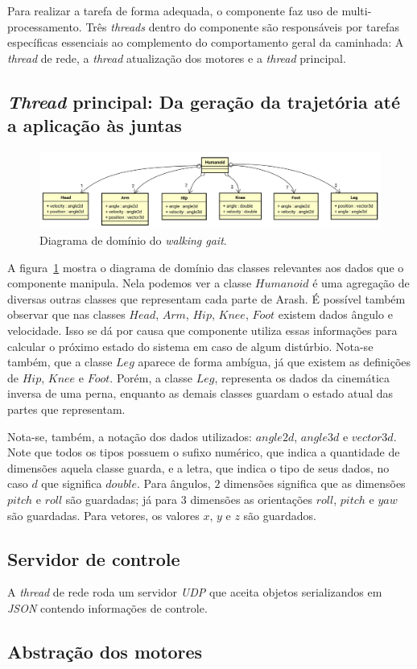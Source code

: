 Para realizar a tarefa de forma adequada, o componente faz uso de multi-processamento. Três \textit{threads} dentro do componente são responsáveis por tarefas específicas essenciais ao complemento do comportamento geral da caminhada: A \textit{thread} de rede, a \textit{thread} atualização dos motores e a \textit{thread} principal.

\subsection{\textit{Thread} principal: Da geração da trajetória até a aplicação às juntas}

\begin{figure}[h!]
	\centering
	\includegraphics[scale=0.4]{imagens/svg/walkinggait-domain}
	\caption{Diagrama de domínio do \textit{walking gait}.}
	\label{fig:walkinggait:domain}
\end{figure}

A figura~\ref{fig:walkinggait:domain} mostra o diagrama de domínio das classes relevantes aos dados que o componente manipula. Nela podemos ver a classe $Humanoid$ é uma agregação de diversas outras classes que representam cada parte de Arash. É possível também observar que nas classes $Head$, $Arm$, $Hip$, $Knee$, $Foot$ existem dados ângulo e velocidade. Isso se dá por causa que componente utiliza essas informações para calcular o próximo estado do sistema em caso de algum distúrbio. Nota-se também, que a classe $Leg$ aparece de forma ambígua, já que existem as definições de $Hip$, $Knee$ e $Foot$. Porém, a classe $Leg$, representa os dados da cinemática inversa de uma perna, enquanto as demais classes guardam o estado atual das partes que representam.

Nota-se, também, a notação dos dados utilizados: $angle2d$, $angle3d$ e $vector3d$. Note que todos os tipos possuem o sufixo numérico, que indica a quantidade de dimensões aquela classe guarda, e a letra, que indica o tipo de seus dados, no caso $d$ que significa $double$. Para ângulos, $2$ dimensões significa que as dimensões $pitch$ e $roll$ são guardadas; já para $3$ dimensões as orientações $roll$, $pitch$ e $yaw$ são guardadas. Para vetores, os valores $x$, $y$ e $z$ são guardados.

\subsection{Servidor de controle}

A \textit{thread} de rede roda um servidor \textit{UDP} que aceita objetos serializandos em \textit{JSON} contendo informações de controle.

\subsection{Abstração dos motores}
\label{subsec:motors_abstraction}